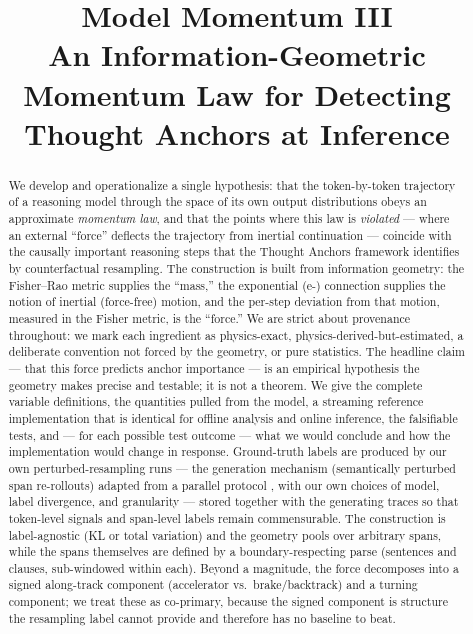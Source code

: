 \documentclass[11pt]{article}
\title{\textbf{Model Momentum III}\\[2pt]
\large An Information-Geometric Momentum Law for Detecting Thought Anchors at Inference}
\author{}
\date{}
\begin{document}
\maketitle

\begin{abstract}
We develop and operationalize a single hypothesis: that the token-by-token trajectory of a reasoning model through the space of its own output distributions obeys an approximate \emph{momentum law}, and that the points where this law is \emph{violated} --- where an external ``force'' deflects the trajectory from inertial continuation --- coincide with the causally important reasoning steps that the Thought Anchors framework \cite{bogdan2025thoughtanchors} identifies by counterfactual resampling. The construction is built from information geometry: the Fisher--Rao metric supplies the ``mass,'' the exponential (e-) connection supplies the notion of inertial (force-free) motion, and the per-step deviation from that motion, measured in the Fisher metric, is the ``force.'' We are strict about provenance throughout: we mark each ingredient as physics-exact, physics-derived-but-estimated, a deliberate convention not forced by the geometry, or pure statistics. The headline claim --- that this force predicts anchor importance --- is an empirical hypothesis the geometry makes precise and testable; it is not a theorem. We give the complete variable definitions, the quantities pulled from the model, a streaming reference implementation that is identical for offline analysis and online inference, the falsifiable tests, and --- for each possible test outcome --- what we would conclude and how the implementation would change in response. Ground-truth labels are produced by our own perturbed-resampling runs --- the generation mechanism (semantically perturbed span re-rollouts) adapted from a parallel protocol \cite{g1protocol}, with our own choices of model, label divergence, and granularity --- stored together with the generating traces so that token-level signals and span-level labels remain commensurable. The construction is label-agnostic (KL or total variation) and the geometry pools over arbitrary spans, while the spans themselves are defined by a boundary-respecting parse (sentences and clauses, sub-windowed within each). Beyond a magnitude, the force decomposes into a signed along-track component (accelerator vs.\ brake/backtrack) and a turning component; we treat these as co-primary, because the signed component is structure the resampling label cannot provide and therefore has no baseline to beat.
\end{abstract}
\end{document}
